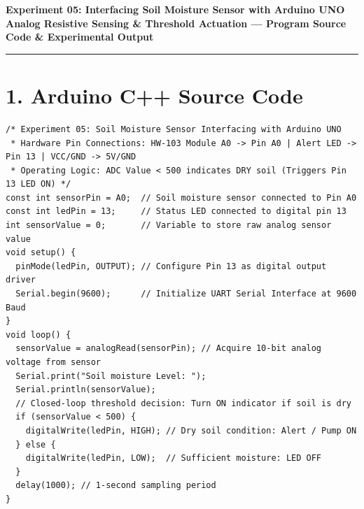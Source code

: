 \documentclass[10pt,a4paper]{article}
\begin{document}
\begin{center}
    {\large\bfseries Experiment 05: Interfacing Soil Moisture Sensor with Arduino UNO}\\[0.08cm]
    {\normalsize\textbf{Analog Resistive Sensing \& Threshold Actuation --- Program Source Code \& Experimental Output}}
\end{center}
\vspace{-0.20cm}
\rule{\textwidth}{0.9pt}
\vspace{0.04cm}

\section*{1. Arduino C++ Source Code}

\begin{lstlisting}[style=bwArduino, title={\textbf{Listing 5.1: Microcontroller Firmware for Soil Moisture Telemetry and Threshold Actuation.}}]
/* Experiment 05: Soil Moisture Sensor Interfacing with Arduino UNO
 * Hardware Pin Connections: HW-103 Module A0 -> Pin A0 | Alert LED -> Pin 13 | VCC/GND -> 5V/GND
 * Operating Logic: ADC Value < 500 indicates DRY soil (Triggers Pin 13 LED ON) */
const int sensorPin = A0;  // Soil moisture sensor connected to Pin A0
const int ledPin = 13;     // Status LED connected to digital pin 13
int sensorValue = 0;       // Variable to store raw analog sensor value
void setup() {
  pinMode(ledPin, OUTPUT); // Configure Pin 13 as digital output driver
  Serial.begin(9600);      // Initialize UART Serial Interface at 9600 Baud
}
void loop() {
  sensorValue = analogRead(sensorPin); // Acquire 10-bit analog voltage from sensor
  Serial.print("Soil moisture Level: ");
  Serial.println(sensorValue);
  // Closed-loop threshold decision: Turn ON indicator if soil is dry
  if (sensorValue < 500) {
    digitalWrite(ledPin, HIGH); // Dry soil condition: Alert / Pump ON
  } else {
    digitalWrite(ledPin, LOW);  // Sufficient moisture: LED OFF
  }
  delay(1000); // 1-second sampling period
}
\end{lstlisting}

\vspace{0.04cm}
\end{document}
